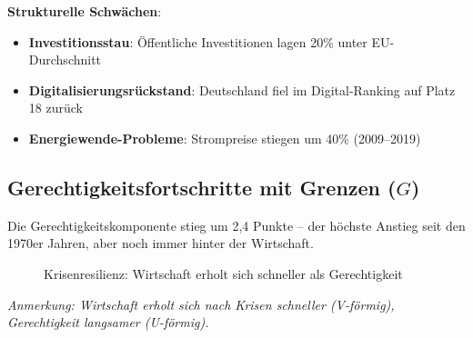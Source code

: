 \textbf{Strukturelle Schwächen}:
\begin{itemize}
    \item \textbf{Investitionsstau}: Öffentliche Investitionen lagen 20\% unter EU-Durchschnitt
    \item \textbf{Digitalisierungsrückstand}: Deutschland fiel im Digital-Ranking auf Platz 18 zurück
    \item \textbf{Energiewende-Probleme}: Strompreise stiegen um 40\% (2009–2019)
\end{itemize}

\subsection{Gerechtigkeitsfortschritte mit Grenzen (\(G\))}

Die Gerechtigkeitskomponente stieg um 2,4 Punkte – der höchste Anstieg seit den 1970er Jahren, aber noch immer hinter der Wirtschaft.

\begin{figure}[ht]
    \centering
    \caption{Krisenresilienz: Wirtschaft erholt sich schneller als Gerechtigkeit}
    \label{fig:krisen_resilienz}
\end{figure}

\begin{flushleft}
\footnotesize{\textit{Anmerkung: Wirtschaft erholt sich nach Krisen schneller (V-förmig), Gerechtigkeit langsamer (U-förmig).}}
\end{flushleft}

